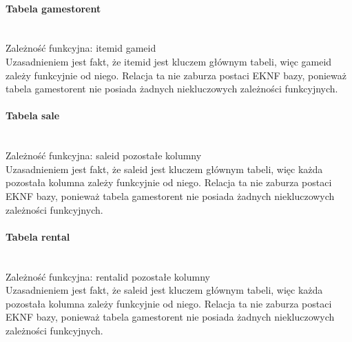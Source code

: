 \documentclass{article}
\begin{document}
	\paragraph{Tabela games\textunderscore to\textunderscore rent}\mbox{}\vspace{0.2cm} \\
	Zależność funkcyjna: item\textunderscore id\mbox{} \textrightarrow \mbox{} game\textunderscore id \vspace{0.2cm} \\
	\noindent Uzasadnieniem jest fakt, że item\textunderscore id jest kluczem głównym tabeli, więc game\textunderscore id zależy funkcyjnie od niego. Relacja ta nie zaburza postaci EKNF bazy, ponieważ tabela games\textunderscore to\textunderscore rent nie posiada żadnych niekluczowych zależności funkcyjnych.
	
	\paragraph{Tabela sale}\mbox{}\vspace{0.2cm} \\
	Zależność funkcyjna: sale\textunderscore id\mbox{} \textrightarrow \mbox{} pozostałe kolumny \vspace{0.2cm} \\
	\noindent Uzasadnieniem jest fakt, że sale\textunderscore id jest kluczem głównym tabeli, więc każda pozostała kolumna zależy funkcyjnie od niego. Relacja ta nie zaburza postaci EKNF bazy, ponieważ tabela games\textunderscore to\textunderscore rent nie posiada żadnych niekluczowych zależności funkcyjnych.
	
	\paragraph{Tabela rental}\mbox{}\vspace{0.2cm} \\
	Zależność funkcyjna: rental\textunderscore id\mbox{} \textrightarrow \mbox{} pozostałe kolumny \vspace{0.2cm} \\
	\noindent Uzasadnieniem jest fakt, że sale\textunderscore id jest kluczem głównym tabeli, więc każda pozostała kolumna zależy funkcyjnie od niego. Relacja ta nie zaburza postaci EKNF bazy, ponieważ tabela games\textunderscore to\textunderscore rent nie posiada żadnych niekluczowych zależności funkcyjnych.
	
\end{document}
